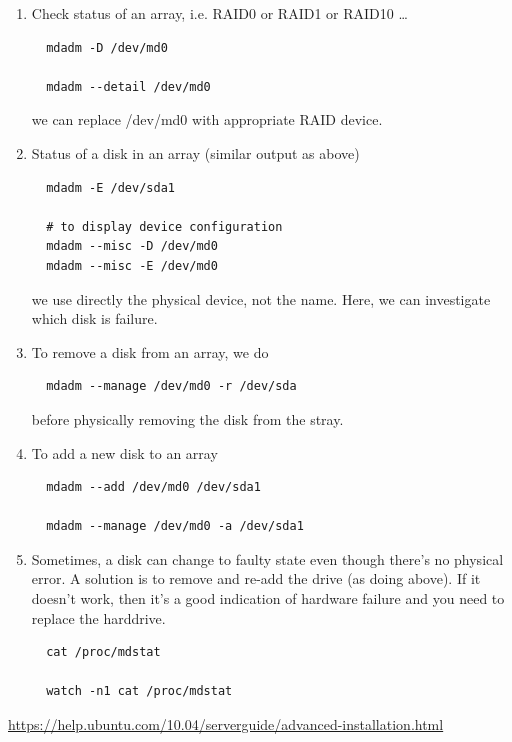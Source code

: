 \begin{enumerate}
  \item Check status of an array, i.e. RAID0 or RAID1 or RAID10 \ldots
  \begin{verbatim}
  mdadm -D /dev/md0
  
  mdadm --detail /dev/md0
  \end{verbatim}
  we can replace /dev/md0 with appropriate RAID device.
  
  \item Status of a disk in an array (similar output as above)
  \begin{verbatim}
  mdadm -E /dev/sda1
  
  # to display device configuration
  mdadm --misc -D /dev/md0
  mdadm --misc -E /dev/md0
  \end{verbatim} 
  we use directly the physical device, not the name. Here, we can investigate
  which disk is failure. 
  
  \item To remove a disk from an array, we do
  \begin{verbatim}
  mdadm --manage /dev/md0 -r /dev/sda
  \end{verbatim}
  before physically removing the disk from the stray.
  
  \item To add a new disk to an array
  \begin{verbatim}
  mdadm --add /dev/md0 /dev/sda1
  
  mdadm --manage /dev/md0 -a /dev/sda1
  \end{verbatim}
  
  \item Sometimes, a disk can change to faulty state even though there's no
  physical error. A solution is to remove and re-add the drive (as doing above).
  If it doesn't work, then it's a good indication of hardware failure and you
  need to replace the harddrive.
  \begin{verbatim}
  cat /proc/mdstat
  
  watch -n1 cat /proc/mdstat
  \end{verbatim}  
\end{enumerate}
\url{https://help.ubuntu.com/10.04/serverguide/advanced-installation.html}


